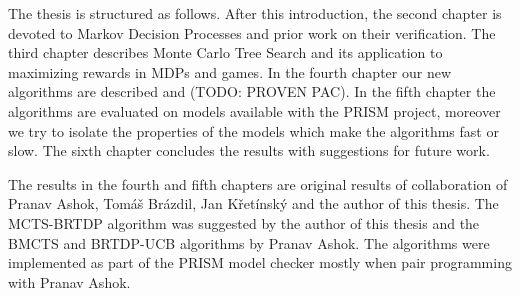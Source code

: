 The thesis is structured as follows. After this introduction, the second
chapter is devoted to Markov Decision Processes and prior work on their
verification.
The third chapter describes Monte Carlo Tree Search and its application
to maximizing rewards in MDPs and games. In the fourth chapter our new
algorithms are described and (TODO: PROVEN PAC). In the fifth chapter
the algorithms are evaluated on models available with the PRISM project,
moreover we try to isolate the properties of the models
which make the algorithms fast or slow. The sixth chapter concludes the
results with suggestions for future work.

The results in the fourth and fifth chapters are original results of
collaboration of Pranav Ashok, Tomáš Brázdil, Jan Křetínský and the
author of this thesis. The MCTS-BRTDP algorithm was suggested by the
author of this thesis and the BMCTS and BRTDP-UCB algorithms by Pranav
Ashok. The algorithms were implemented as part of the PRISM model
checker mostly when pair programming with Pranav Ashok.

